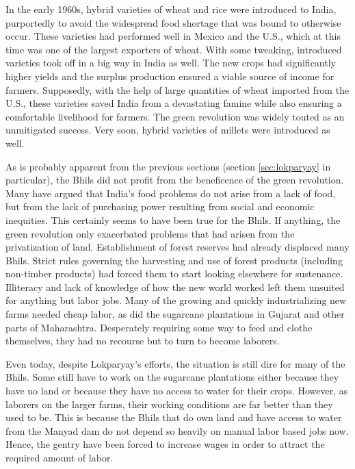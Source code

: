\documentclass[report.tex]{subfiles}
\begin{document}
In the early 1960s, hybrid varieties of wheat and rice were introduced to India, purportedly to avoid the widespread food shortage that was bound to otherwise occur. These varieties had performed well in Mexico and the U.S., which at this time was one of the largest exporters of wheat. With some tweaking, introduced varieties took off in a big way in India as well. The new crops had significantly higher yields and the surplus production ensured a viable source of income for farmers. Supposedly, with the help of large quantities of wheat imported from the U.S., these varieties saved India from a devastating famine while also ensuring a comfortable livelihood for farmers. The green revolution was widely touted as an unmitigated success. Very soon, hybrid varieties of millets were introduced as well.

As is probably apparent from the previous sections (section \ref{sec:lokparyay} in particular), the Bhils did not profit from the beneficence of the green revolution. Many have argued that India's food problems do not arise from a lack of food, but from the lack of purchasing power resulting from social and economic inequities. This certainly seems to have been true for the Bhils. If anything, the green revolution only exacerbated problems that had arisen from the privatization of land. Establishment of forest reserves had already displaced many Bhils. Strict rules governing the harvesting and use of forest products (including non-timber products) had forced them to start looking elsewhere for sustenance. Illiteracy and lack of knowledge of how the new world worked left them unsuited for anything but labor jobs. Many of the growing and quickly industrializing new farms needed cheap labor, as did the sugarcane plantations in Gujarat and other parts of Maharashtra. Desperately requiring some way to feed and clothe themselves, they had no recourse but to turn to become laborers.

Even today, despite Lokparyay's efforts, the situation is still dire for many of the Bhils. Some still have to work on the sugarcane plantations either because they have no land or because they have no access to water for their crops. However, as laborers on the larger farms, their working conditions are far better than they used to be. This is because the Bhils that do own land and have access to water from the Manyad dam do not depend so heavily on manual labor based jobs now. Hence, the gentry have been forced to increase wages in order to attract the required amount of labor.
\end{document}
